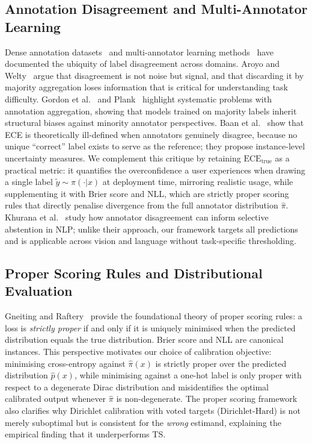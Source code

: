 \documentclass[10pt,journal,compsoc]{IEEEtran}
\newcommand{\pihat}{\hat{\pi}}
\newcommand{\ECE}{\mathrm{ECE}}
\newcommand{\ECEtrue}{\ECE_{\text{true}}}
\begin{document}
\subsection{Annotation Disagreement and Multi-Annotator Learning}
Dense annotation datasets~\cite{peterson2019human,nie2020what} and multi-annotator learning methods~\cite{uma2021learning,rodrigues2018deep} have documented the ubiquity of label disagreement across domains.  Aroyo and Welty~\cite{aroyo2015truth} argue that disagreement is not noise but signal, and that discarding it by majority aggregation loses information that is critical for understanding task difficulty.  Gordon et al.~\cite{gordon2022jury} and Plank~\cite{plank2022problem} highlight systematic problems with annotation aggregation, showing that models trained on majority labels inherit structural biases against minority annotator perspectives.  Baan et al.~\cite{baan2022stop} show that ECE is theoretically ill-defined when annotators genuinely disagree, because no unique ``correct'' label exists to serve as the reference; they propose instance-level uncertainty measures.  We complement this critique by retaining $\ECEtrue$ as a practical metric: it quantifies the overconfidence a user experiences when drawing a single label $\tilde{y}\sim\pi(\cdot|x)$ at deployment time, mirroring realistic usage, while supplementing it with Brier score and NLL, which are strictly proper scoring rules that directly penalise divergence from the full annotator distribution $\pihat$.  Khurana et al.~\cite{crowd_calibrator2024} study how annotator disagreement can inform selective abstention in NLP; unlike their approach, our framework targets all predictions and is applicable across vision and language without task-specific thresholding.

\subsection{Proper Scoring Rules and Distributional Evaluation}
Gneiting and Raftery~\cite{gneiting2007strictly} provide the foundational theory of proper scoring rules: a loss is \emph{strictly proper} if and only if it is uniquely minimised when the predicted distribution equals the true distribution.  Brier score and NLL are canonical instances.  This perspective motivates our choice of calibration objective: minimising cross-entropy against $\pihat(x)$ is strictly proper over the predicted distribution $\hat{p}(x)$, while minimising against a one-hot label is only proper with respect to a degenerate Dirac distribution and misidentifies the optimal calibrated output whenever $\pihat$ is non-degenerate.  The proper scoring framework also clarifies why Dirichlet calibration with voted targets ($\mathrm{Dirichlet\text{-}Hard}$) is not merely suboptimal but is consistent for the \emph{wrong} estimand, explaining the empirical finding that it underperforms TS.
\end{document}
